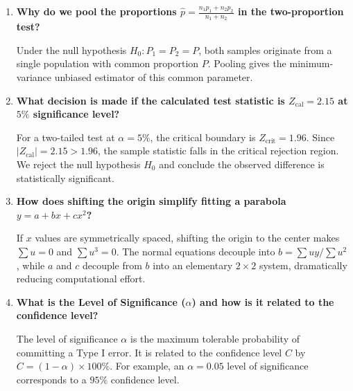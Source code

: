 \documentclass[12pt,a4paper]{article}
\newcommand{\Q}[1]{\textbf{#1}\par\noindent\ignorespaces}
\begin{document}
\begin{tcolorbox}[exambox, title={\textbf{Frequently Asked / Viva Questions}}]
\begin{enumerate}[topsep=0pt, label=\textbf{Q\arabic*.}, itemsep=5pt]
  \item \Q{Why do we pool the proportions $\hat{p} = \frac{n_1 p_1 + n_2 p_2}{n_1 + n_2}$ in the two-proportion test?}
  Under the null hypothesis $H_0: P_1 = P_2 = P$, both samples originate from a single population with common proportion $P$. Pooling gives the minimum-variance unbiased estimator of this common parameter.
  \item \Q{What decision is made if the calculated test statistic is $Z_{\text{cal}} = 2.15$ at $5\%$ significance level?}
  For a two-tailed test at $\alpha = 5\%$, the critical boundary is $Z_{\text{crit}} = 1.96$. Since $|Z_{\text{cal}}| = 2.15 > 1.96$, the sample statistic falls in the critical rejection region. We reject the null hypothesis $H_0$ and conclude the observed difference is statistically significant.

  \item \Q{How does shifting the origin simplify fitting a parabola $y = a + bx + cx^2$?}
  If $x$ values are symmetrically spaced, shifting the origin to the center makes $\sum u = 0$ and $\sum u^3 = 0$. The normal equations decouple into $b = \sum uy / \sum u^2$, while $a$ and $c$ decouple from $b$ into an elementary $2 \times 2$ system, dramatically reducing computational effort.

  \item \Q{What is the Level of Significance ($\alpha$) and how is it related to the confidence level?}
  The level of significance $\alpha$ is the maximum tolerable probability of committing a Type I error. It is related to the confidence level $C$ by $C = (1 - \alpha) \times 100\%$. For example, an $\alpha = 0.05$ level of significance corresponds to a $95\%$ confidence level.
\end{enumerate}
\end{tcolorbox}

\vspace{2pt}
\end{document}
